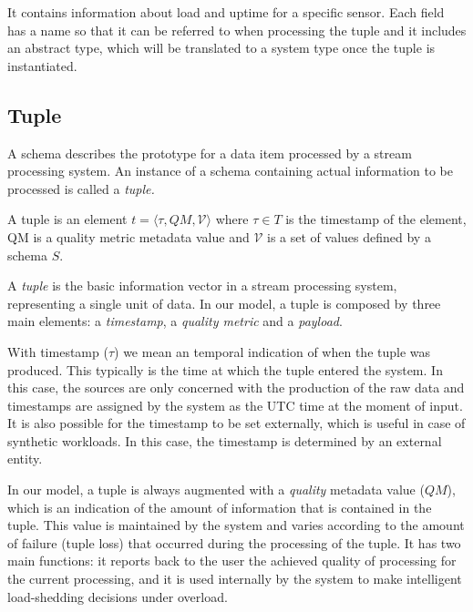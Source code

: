 It contains information about load and uptime for a specific sensor. Each field has a name so that
it can be referred to when processing the tuple and it includes an abstract type, which will be
translated to a system type once the tuple is instantiated.\\

\subsection*{Tuple}
A schema describes the prototype for a data item processed by a stream processing system. 
An instance of a schema containing actual information to be processed is called a \emph{tuple.}


\begin{definition}[Tuple]{ 
A tuple is an element $t = \langle \tau, QM, \mathcal{V} \rangle$ where $\tau \in T$ is the
timestamp of the element, QM is a quality metric metadata value and 
$\mathcal{V}$ is a set of values defined by a schema $S$.
}
\end{definition}

A \textit{tuple} is the basic information vector in a stream processing system, representing a
single unit of data. In our model, a tuple is composed by three main elements: a
\textit{timestamp}, a \textit{quality metric} and a \textit{payload}.

With timestamp ($\tau$) we mean an temporal indication of when the tuple was produced. This typically is
the time at which the tuple entered the system. In this case, the sources are only concerned with the
production of the raw data and timestamps are assigned by the system as the UTC time at the moment of
input. It is also possible for the timestamp to be set externally, which is useful in case
of synthetic workloads. In this case, the timestamp is determined by an external entity.

In our model, a tuple is always augmented with a \emph{quality} metadata value ($QM$), which is an
indication of the amount of information that is contained in the tuple. This value is maintained by the
system and varies according to the amount of failure (\ie tuple loss) that occurred during the
processing of the tuple.
It has two main functions: it reports back to the user the achieved quality of processing for the
current processing, and it is used internally by the system to make intelligent load-shedding decisions
under overload.

